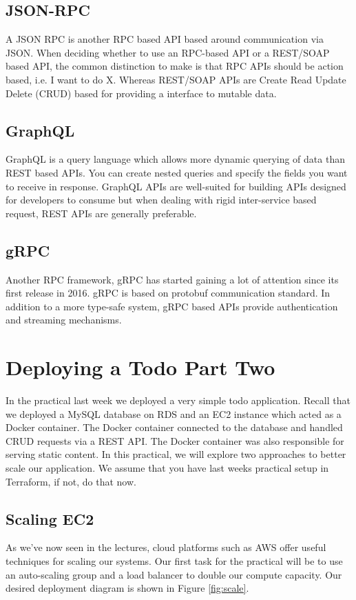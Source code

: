 \documentclass{csse4400}
\begin{document}
\subsection{JSON-RPC}
A JSON RPC is another RPC based API based around communication via JSON.
When deciding whether to use an RPC-based API or a REST/SOAP based API,
the common distinction to make is that RPC APIs should be action based, i.e. I want to do X.
Whereas REST/SOAP APIs are Create Read Update Delete (CRUD) based for providing a interface to mutable data.

\subsection{GraphQL}
GraphQL is a query language which allows more dynamic querying of data than REST based APIs.
You can create nested queries and specify the fields you want to receive in response.
GraphQL APIs are well-suited for building APIs designed for developers to consume but when dealing with rigid inter-service based request,
REST APIs are generally preferable.

\subsection{gRPC}
Another RPC framework, gRPC has started gaining a lot of attention since its first release in 2016.
gRPC is based on protobuf communication standard.
In addition to a more type-safe system,
gRPC based APIs provide authentication and streaming mechanisms.

\section{Deploying a Todo Part Two}

In the practical last week we deployed a very simple todo application.
Recall that we deployed a MySQL database on RDS and an EC2 instance which acted as a Docker container.
The Docker container connected to the database and handled CRUD requests via a REST API.
The Docker container was also responsible for serving static content.
In this practical, we will explore two approaches to better scale our application.
We assume that you have last weeks practical setup in Terraform, if not, do that now.


\subsection{Scaling EC2}
As we've now seen in the lectures,
cloud platforms such as AWS offer useful techniques for scaling our systems.
Our first task for the practical will be to use an auto-scaling group and a load balancer to double our compute capacity.
Our desired deployment diagram is shown in Figure \ref{fig:scale}.
\end{document}

